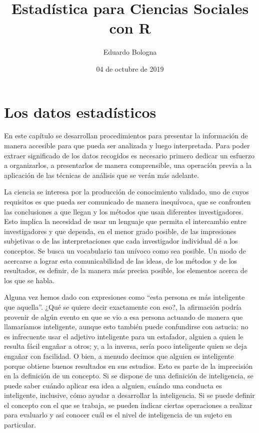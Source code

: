 \documentclass[]{book}
\title{Estadística para Ciencias Sociales con R}
\author{Eduardo Bologna}
\date{04 de octubre de 2019}
\begin{document}
\maketitle

{
\hypersetup{linkcolor=black}
\setcounter{tocdepth}{1}
\tableofcontents
}
\listoftables
\listoffigures
\hypertarget{section}{%
\chapter*{}\label{section}}

\hypertarget{los-datos-estadisticos}{%
\chapter{Los datos estadísticos}\label{los-datos-estadisticos}}

En este capítulo se desarrollan procedimientos para presentar la información de manera accesible para que pueda ser analizada y luego interpretada. Para poder extraer significado de los datos recogidos es necesario primero dedicar un esfuerzo a organizarlos, a presentarlos de manera comprensible, una operación previa a la aplicación de las técnicas de análisis que se verán más adelante.

La ciencia se interesa por la producción de conocimiento validado, uno de cuyos requisitos es que pueda ser comunicado de manera inequívoca, que se confronten las conclusiones a que llegan y los métodos que usan diferentes investigadores. Esto implica la necesidad de usar un lenguaje que permita el intercambio entre investigadores y que dependa, en el menor grado posible, de las impresiones subjetivas o de las interpretaciones que cada investigador individual dé a los conceptos. Se busca un vocabulario tan unívoco como sea posible. Un modo de acercarse a lograr esta comunicabilidad de las ideas, de los métodos y de los resultados, es definir, de la manera más precisa posible, los elementos acerca de los que se habla.

Alguna vez hemos dado con expresiones como ``esta persona es más inteligente que aquella''. ¿Qué se quiere decir exactamente con eso?, la afirmación podría provenir de algún evento en que se vio a esa persona actuando de manera que llamaríamos inteligente, aunque esto también puede confundirse con astucia: no es infrecuente usar el adjetivo inteligente para un estafador, alguien a quien le resulta fácil engañar a otros; y, a la inversa, sería poco inteligente quien se deja engañar con facilidad. O bien, a menudo decimos que alguien es inteligente porque obtiene buenos resultados en sus estudios. Esto es parte de la imprecisión en la definición de un concepto. Si se dispone de una definición de inteligencia, se puede saber cuándo aplicar esa idea a alguien, cuándo una conducta es inteligente, inclusive, cómo ayudar a desarrollar la inteligencia. Si se puede definir el concepto con el que se trabaja, se pueden indicar ciertas operaciones a realizar para evaluarlo y así conocer cuál es el nivel de inteligencia de un sujeto en particular.
\end{document}
